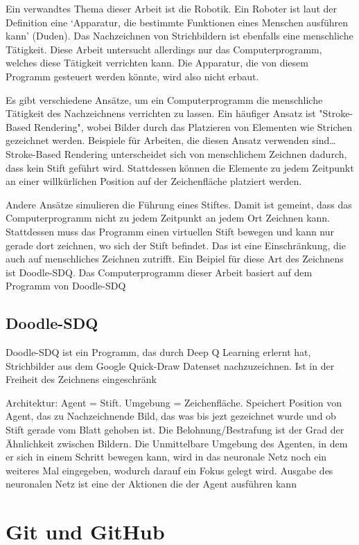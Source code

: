 Ein verwandtes Thema dieser Arbeit ist die Robotik. Ein Roboter ist laut der
Definition eine `Apparatur, die bestimmte Funktionen eines Menschen ausführen
kann' (Duden). Das Nachzeichnen von Strichbildern ist ebenfalls eine menschliche
Tätigkeit. Diese Arbeit untersucht allerdings nur das Computerprogramm, welches
diese Tätigkeit verrichten kann. Die Apparatur, die von diesem Programm
gesteuert werden könnte, wird also nicht erbaut.

Es gibt verschiedene Ansätze, um ein Computerprogramm die menschliche Tätigkeit
des Nachzeichnens verrichten zu lassen. Ein häufiger Ansatz ist "Stroke-Based
Rendering", wobei Bilder durch das Platzieren von Elementen wie Strichen
gezeichnet werden. Beispiele für Arbeiten, die diesen Ansatz verwenden sind\dots
Stroke-Based Rendering unterscheidet sich von menschlichem Zeichnen dadurch,
dass kein Stift geführt wird. Stattdessen können die Elemente zu jedem Zeitpunkt
an einer willkürlichen Position auf der Zeichenfläche platziert werden.

Andere Ansätze simulieren die Führung eines Stiftes. Damit ist gemeint, dass das
Computerprogramm nicht zu jedem Zeitpunkt an jedem Ort Zeichnen kann.
Stattdessen muss das Programm einen virtuellen Stift bewegen und kann nur gerade
dort zeichnen, wo sich der Stift befindet. Das ist eine Einschränkung, die auch
auf menschliches Zeichnen zutrifft. Ein Beipiel für diese Art des Zeichnens ist
Doodle-SDQ. Das Computerprogramm dieser Arbeit basiert auf dem Programm von
Doodle-SDQ 

\subsection*{Doodle-SDQ}
Doodle-SDQ ist ein Programm, das durch Deep Q Learning erlernt hat, Strichbilder aus dem Google Quick-Draw Datenset nachzuzeichnen. 
Ist in der Freiheit des Zeichnens eingeschränk\indent 

Architektur: Agent = Stift. Umgebung = Zeichenfläche. Speichert Position von
Agent, das zu Nachzeichnende Bild, das was bis jezt gezeichnet wurde und ob
Stift gerade vom Blatt gehoben ist. Die Belohnung/Bestrafung ist der Grad der
Ähnlichkeit zwischen Bildern. Die Unmittelbare Umgebung des Agenten, in dem er
sich in einem Schritt bewegen kann, wird in das neuronale Netz noch ein weiteres
Mal eingegeben, wodurch darauf ein Fokus gelegt wird. Ausgabe des neuronalen
Netz ist eine der Aktionen die der Agent ausführen kann




\section{Git und GitHub}
\label{chap:t_git}